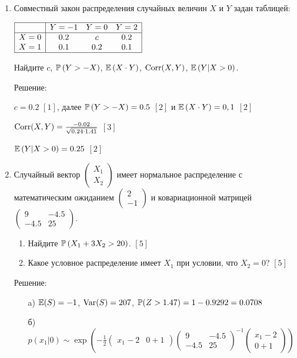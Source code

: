 \documentclass[12pt, a4paper]{article}\usepackage[]{graphicx}\usepackage[]{color}
\begin{document}
\begin{enumerate}
\item Совместный закон распределения случайных величин  $X$  и  $Y$
задан таблицей:

$\begin{array}{|c|ccc|}
\hline
{} & {Y=-1} & {Y=0} & {Y=2}\\
\hline
{X=0} & {0.2} & {c} & {0.2}\\
{X=1} & {0.1} & {0.2} & {0.1} \\
\hline
\end{array}$

Найдите  $c$,  $\P\left(Y>-X\right)$,  $\E\left(X\cdot Y \right)$, $\Corr(X,Y)$, $\E\left(Y|X>0\right)$.

Решение:

$c=0.2$ $[1]$, далее $\P\left(Y>-X\right)=0.5$ $[2]$ и $\E\left(X\cdot Y\right)=0,1$ $[2]$

$\Corr(X,Y)=\frac{-0.02}{\sqrt{0.24\cdot 1.41}}$ $[3]$

$\E\left(Y|X>0\right)=0.25$ $[2]$

\item Случайный вектор  $\left(\begin{array}{c}
{X_{1} } \\ {X_{2} }
\end{array}\right)$  имеет нормальное распределение с
математическим ожиданием  $\left(\begin{array}{c} {2} \\ {-1}
\end{array}\right)$  и ковариационной матрицей
$\left(\begin{array}{cc} {9} & {-4.5} \\ {-4.5} & {25}
\end{array}\right)$.
\begin{enumerate}
\item Найдите  $\P\left(X_{1} +3X_{2} >20\right)$. $[5]$
\item Какое условное распределение имеет $X_{1}$ при условии, что $X_{2}=0$? $[5]$
\end{enumerate}
Решение:
\begin{enumerate}
\item[a)] $\E(S)=-1$, $\Var(S)=207$, $\P(Z>1.47)=1-0.9292=0.0708$
\item[б)] $p(x_{1}|0)\sim \exp\left(-\frac{1}{2}\left(\begin{array}{cc} {x_{1}-2} & {0+1} \end{array}\right) \left(\begin{array}{cc} {9} & {-4.5} \\ {-4.5} & {25}
\end{array}\right)^{-1}\left(\begin{array}{c} {x_{1}-2} \\ {0+1}
\end{array}\right)\right)$


\end{enumerate}
\end{enumerate}
\end{document}
